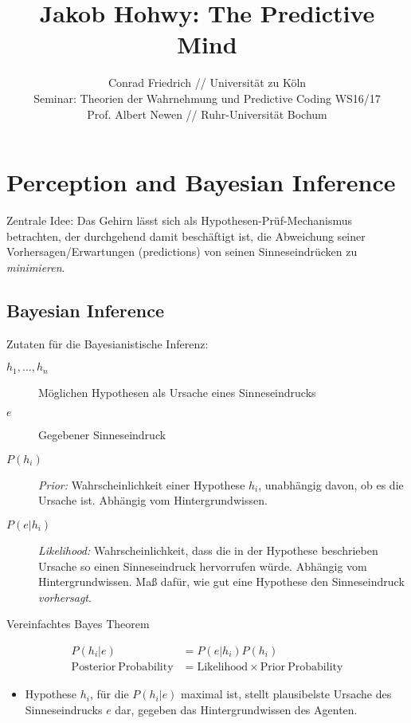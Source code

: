 \documentclass[11pt]{article}
\title{Jakob Hohwy: The Predictive Mind}
\author{\small Conrad Friedrich // Universität zu Köln \\ \small Seminar: Theorien der Wahrnehmung und Predictive Coding WS16/17 \\ \small Prof. Albert Newen // \small Ruhr-Universität Bochum}
\begin{document}
  \maketitle

\section{Perception and Bayesian Inference}


Zentrale Idee: Das Gehirn lässt sich als
    Hypothesen-Prüf-Mechanismus betrachten, der durchgehend damit
    beschäftigt ist, die Abweichung seiner Vorhersagen/Erwartungen
    (predictions) von seinen Sinneseindrücken zu \emph{minimieren}.


\subsection{Bayesian Inference}

  Zutaten für die Bayesianistische Inferenz:

  \begin{description}
  \item[$h_1,...,h_n$] Möglichen Hypothesen als Ursache eines
    Sinneseindrucks
  \item[$e$] Gegebener Sinneseindruck
  \item[$P(h_i)$] \emph{Prior:} Wahrscheinlichkeit einer Hypothese
    $h_i$, unabhängig davon, ob es die Ursache ist. Abhängig vom
    Hintergrundwissen.
  \item[$P(e|h_i)$] \emph{Likelihood:} Wahrscheinlichkeit, dass die in
    der Hypothese beschrieben Ursache so einen Sinneseindruck
    hervorrufen würde. Abhängig vom Hintergrundwissen. Maß dafür, wie
    gut eine Hypothese den Sinneseindruck \emph{vorhersagt}.
  \end{description}


  Vereinfachtes Bayes Theorem 

  \begin{align*}
    P(h_i|e) &= P(e|h_i)P(h_i) \\
    \mathrm{Posterior \: Probability} &= \mathrm{Likelihood} \times  \mathrm{Prior \: Probability}
  \end{align*}

  \begin{itemize}
  \item Hypothese $h_i$, für die $P(h_i|e)$ maximal ist, stellt
    plausibelste Ursache des Sinneseindrucks $e$ dar, gegeben das
    Hintergrundwissen des Agenten.
  \end{itemize}
\end{document}
